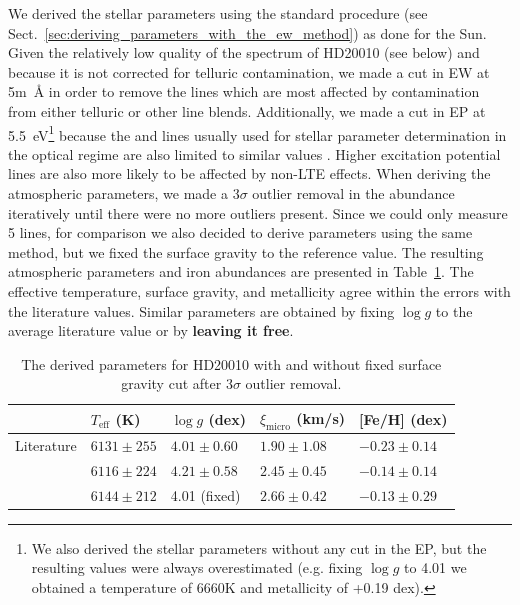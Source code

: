 \documentclass{aa}
\begin{document}
We derived the stellar parameters using the standard procedure (see
Sect.~\ref{sec:deriving_parameters_with_the_ew_method}) as done for
the Sun. Given the relatively low quality of the spectrum of HD20010
(see below) and because  it is not corrected for telluric
contamination, we made a cut in EW at 5\si{m\angstrom} in order to
remove the lines which are most affected by contamination from either
telluric or other line blends. Additionally, we made a cut in EP at
\SI{5.5}{eV}\footnote{We also derived the stellar parameters without
any cut in the EP, but the resulting values were always overestimated
(e.g. fixing $\log g$ to 4.01 we obtained a temperature of 6660K and
metallicity of +0.19 dex).} because the  and
 lines usually used for stellar parameter determination
in the optical regime are also limited to similar values \citep[see
e.g.][]{Sousa2008a}. Higher excitation potential lines are also more
likely to be affected by non-LTE effects. When deriving the atmospheric
parameters, we made a $3\sigma$ outlier removal in the abundance
iteratively until there were no more outliers present. Since we could
only measure 5  lines, for comparison we also decided to
derive parameters using the same method, but we fixed the surface gravity
to the reference value. The resulting atmospheric parameters
and iron abundances are presented in Table~\ref{tab:hd20010}. The
effective temperature, surface gravity, and metallicity agree within the
errors with the literature values. Similar parameters are obtained by
fixing $\log g$ to the average literature value or by \textbf{leaving it free}.

\begin{table}[htb!]
    \caption{The derived parameters for HD20010 with and without
    fixed surface gravity cut after 3$\sigma$ outlier removal.}
    \label{tab:hd20010}
    \centering
    \begin{tabular}{lllll}
      \hline\hline
                     & $T_\mathrm{eff}$ (K) &  $\log g$ (dex)  &   $\xi_\mathrm{micro}$ (km/s)  & [Fe/H] (dex)      \\
      \hline
        Literature   & $6131 \pm 255$       &  $4.01 \pm 0.60$ &    $1.90 \pm 1.08$              & $-0.23 \pm 0.14$ \\
      \hline
                     & $6116 \pm 224$       &  $4.21 \pm 0.58$ &    $2.45 \pm 0.45$              & $-0.14 \pm 0.14$ \\
                     & $6144 \pm 212$       &   4.01 (fixed)   &    $2.66 \pm 0.42$              & $-0.13 \pm 0.29$ \\
      \hline
    \end{tabular}
\end{table}
\end{document}

